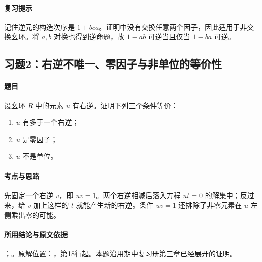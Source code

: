 \paragraph{复习提示}

记住逆元的构造次序是 $1+bca$。证明中没有交换任意两个因子，因此适用于非交换幺环。将 $a,b$ 对换也得到逆命题，故 $1-ab$ 可逆当且仅当 $1-ba$ 可逆。



\subsection{习题2：右逆不唯一、零因子与非单位的等价性}

\label{ex:3:2}

\paragraph{题目}

设幺环 $R$ 中的元素 $u$ 有右逆。证明下列三个条件等价：
\begin{enumerate}
  \item $u$ 有多于一个右逆；
  \item $u$ 是零因子；
  \item $u$ 不是单位。
\end{enumerate}

\paragraph{考点与思路}

先固定一个右逆 $v$，即 $uv=1$。两个右逆相减后落入方程 $ut=0$ 的解集中；反过来，给 $v$ 加上这样的 $t$ 就能产生新的右逆。条件 $uv=1$ 还排除了非零元素在 $u$ 左侧乘出零的可能。

\paragraph{所用结论与原文依据}

；。原解位置：，第18行起。本题沿用期中复习册第三章已经展开的证明。


